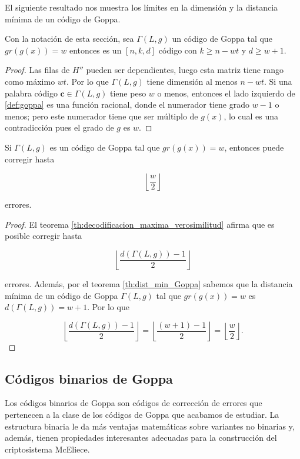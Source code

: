 El siguiente resultado nos muestra los límites en la dimensión y la distancia mínima de un código de Goppa.

\begin{theorem}
    \label{th:dist_min_Goppa}
    Con la notación de esta sección, sea $\Gamma(L,g)$ un código de Goppa tal que $gr(g(x)) = w$ entonces es un $[n, k, d]$ código con $k \geq n - wt$ y $d \geq w + 1$.
\end{theorem}

\begin{proof}
    Las filas de $H''$ pueden ser dependientes, luego esta matriz tiene rango como máximo $wt$. Por lo que $\Gamma(L,g)$ tiene dimensión al menos $n - wt$. Si una palabra código $\textbf{c} \in \Gamma(L,g)$ tiene peso $w$ o menos, entonces el lado izquierdo de \ref{def:goppa} es una función racional, donde el numerador tiene grado $w - 1$ o menos; pero este numerador tiene que ser múltiplo de $g(x)$, lo cual es una contradicción pues el grado de $g$ es $w$.
\end{proof}

\begin{corollary}
    Si $\Gamma(L,g)$ es un código de Goppa tal que $gr(g(x)) = w$, entonces puede corregir hasta

    $$\left\lfloor \frac{w}{2} \right\rfloor $$

    errores.
\end{corollary}

\begin{proof}
    El teorema \ref{th:decodificacion_maxima_verosimilitud} afirma que es posible corregir hasta 
    
    $$\left\lfloor \frac{d(\Gamma(L,g)) - 1}{2} \right\rfloor$$

    errores. Además, por el teorema \ref{th:dist_min_Goppa} sabemos que la distancia mínima de un código de Goppa $\Gamma(L,g)$ tal que $gr(g(x)) = w$ es $d(\Gamma(L,g)) = w + 1$. Por lo que

    $$\left\lfloor \frac{d(\Gamma(L,g)) - 1}{2} \right\rfloor = \left\lfloor \frac{(w + 1) - 1}{2} \right\rfloor = \left\lfloor \frac{w}{2} \right\rfloor .$$
\end{proof}

\subsection{Códigos binarios de Goppa}

Los códigos binarios de Goppa son códigos de corrección de errores que pertenecen a la clase de los códigos de Goppa que acabamos de estudiar. La estructura binaria le da más ventajas matemáticas sobre variantes no binarias y, además, tienen propiedades interesantes adecuadas para la construcción del criptosistema McEliece.


